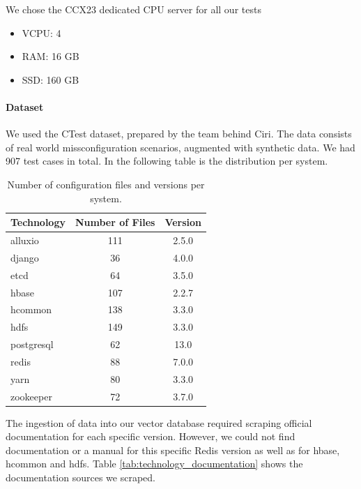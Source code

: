 We chose the CCX23 dedicated CPU server\cite{hetzner-online-gmbh-2025} for all our tests
\begin{itemize}
    \item VCPU: 4
    \item RAM: 16 GB
    \item SSD: 160 GB
\end{itemize}

\paragraph{Dataset} 
We used the CTest dataset, prepared by the team behind Ciri\cite{Lian.2024}\cite{xlab-uiuc-2025}. The data consists of real world missconfiguration scenarios, augmented with synthetic data. We had 907 test cases in total. In the following table is the distribution per system.

\begin{table}[h]
    \centering
    \begin{tabular}{|l|c|c|}
        \hline
        \textbf{Technology} & \textbf{Number of Files} & \textbf{Version} \\
        \hline
        alluxio & 111 & 2.5.0 \\
        django & 36 & 4.0.0 \\
        etcd & 64 & 3.5.0 \\
        hbase & 107 & 2.2.7 \\
        hcommon & 138 & 3.3.0 \\
        hdfs & 149 & 3.3.0 \\
        postgresql & 62 & 13.0 \\
        redis & 88 & 7.0.0 \\
        yarn & 80 & 3.3.0 \\
        zookeeper & 72 & 3.7.0 \\
        \hline
    \end{tabular}
    \caption{Number of configuration files and versions per system.}
    \label{tab:technology_values}
\end{table}

The ingestion of data into our vector database required scraping official documentation for each specific version. However, we could not find documentation or a manual for this specific Redis version as well as for hbase, hcommon and hdfs. Table \ref{tab:technology_documentation} shows the documentation sources we scraped.

